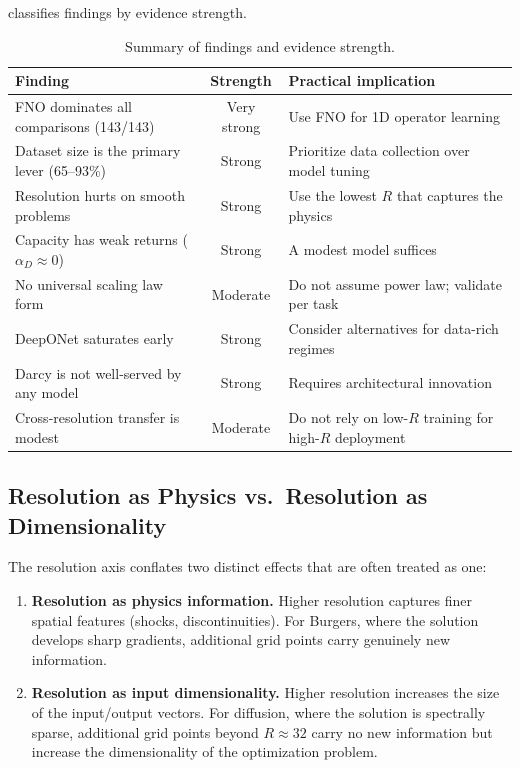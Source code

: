 \documentclass[11pt]{article}
\begin{document}
 classifies findings by evidence strength.

\begin{table}[h]
\centering
\caption{Summary of findings and evidence strength.}
\label{tab:evidence}
\small
\begin{tabular}{@{}p{6.5cm}cp{5cm}@{}}
\toprule
\textbf{Finding} & \textbf{Strength} &
\textbf{Practical implication} \\
\midrule
FNO dominates all comparisons (143/143) &
Very strong &
Use FNO for 1D operator learning \\
Dataset size is the primary lever (65--93\%) &
Strong &
Prioritize data collection over model tuning \\
Resolution hurts on smooth problems &
Strong &
Use the lowest $R$ that captures the physics \\
Capacity has weak returns ($\alpha_D \approx 0$) &
Strong &
A modest model suffices \\
No universal scaling law form &
Moderate &
Do not assume power law; validate per task \\
DeepONet saturates early &
Strong &
Consider alternatives for data-rich regimes \\
Darcy is not well-served by any model &
Strong &
Requires architectural innovation \\
Cross-resolution transfer is modest &
Moderate &
Do not rely on low-$R$ training for high-$R$
deployment \\
\bottomrule
\end{tabular}
\end{table}

\subsection{Resolution as Physics vs.\ Resolution as Dimensionality}
\label{sec:res-discussion}

The resolution axis conflates two distinct effects that are often
treated as one:

\begin{enumerate}[leftmargin=*,itemsep=2pt]
  \item \textbf{Resolution as physics information.}
    Higher resolution captures finer spatial features (shocks,
    discontinuities). For Burgers, where the solution develops
    sharp gradients, additional grid points carry genuinely new
    information.

  \item \textbf{Resolution as input dimensionality.}
    Higher resolution increases the size of the input/output vectors.
    For diffusion, where the solution is spectrally sparse, additional
    grid points beyond $R \approx 32$ carry no new information but
    increase the dimensionality of the optimization problem.
\end{enumerate}
\end{document}
